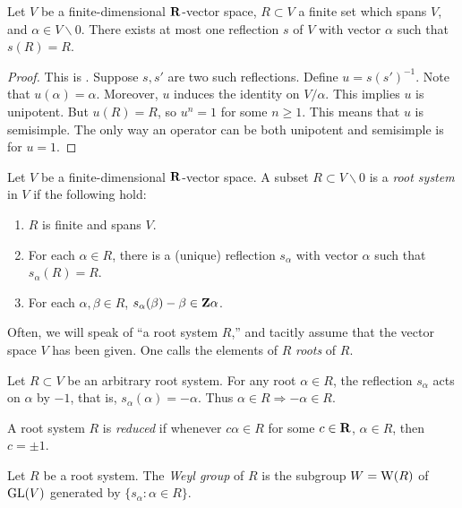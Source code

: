 \begin{lemma}
Let $V$ be a finite-dimensional $\mathbf{R}$-vector space, $R\subset V$ a finite 
set which spans $V$, and $\alpha\in V\smallsetminus 0$. There exists at most 
one reflection $s$ of $V$ with vector $\alpha$ such that $s(R)=R$. 
\end{lemma}
\begin{proof}
This is \cite[VI \S 1.1 lem.1]{bourbaki-lie-alg-4-6}. 
Suppose $s,s'$ are two such reflections. Define $u=s (s')^{-1}$. Note that 
$u(\alpha)=\alpha$. Moreover, $u$ induces the identity on $V/\alpha$. This 
implies $u$ is unipotent. But $u(R)=R$, so $u^n=1$ for some $n\geqslant 1$. 
This means that $u$ is semisimple. The only way an operator can be both 
unipotent and semisimple is for $u=1$. 
\end{proof}

\begin{definition}
Let $V$ be a finite-dimensional $\mathbf{R}$-vector space. A subset 
$R\subset V\smallsetminus 0$ is a \emph{root system} in $V$ if the following 
hold:
\begin{enumerate}
  \item $R$ is finite and spans $V$. 
  \item For each $\alpha\in R$, there is a (unique) reflection $s_\alpha$ with 
    vector $\alpha$ such that $s_\alpha(R) = R$. 
  \item For each $\alpha,\beta\in R$, $s_\alpha(\beta)-\beta\in \mathbf{Z}\alpha$. 
\end{enumerate}
\end{definition}

Often, we will speak of ``a root system $R$,'' and tacitly assume that the 
vector space $V$ has been given. One calls the elements of $R$ \emph{roots} 
of $R$. 

Let $R\subset V$ be an arbitrary root system. For any root $\alpha\in R$, the 
reflection $s_\alpha$ acts on $\alpha$ by $-1$, that is, 
$s_\alpha(\alpha)=-\alpha$. Thus $\alpha\in R\Rightarrow -\alpha\in R$. 

\begin{definition}
A root system $R$ is \emph{reduced} if whenever $c\alpha\in R$ for some 
$c\in \mathbf{R}$, $\alpha\in R$, then $c=\pm 1$. 
\end{definition}

\begin{definition}
Let $R$ be a root system. The \emph{Weyl group} of $R$ is the subgroup 
$W=\operatorname{W}(R)$ of $\operatorname{GL}(V)$ generated by $\{s_\alpha:\alpha\in R\}$. 
\end{definition}

